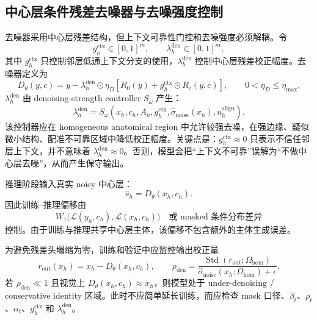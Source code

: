 \documentclass[11pt,a4paper,UTF8,fontset=fandol]{ctexart}
\theoremstyle{definition}
\DeclareMathOperator{\Std}{Std}
\begin{document}
\subsection{中心层条件残差去噪器与去噪强度控制}

去噪器采用中心层残差结构，但上下文可靠性门控和去噪强度必须解耦。令
\begin{equation}
    g_h^{\mathrm{ctx}}\in[0,1]^m,
    \qquad
    \lambda_h^{\mathrm{den}}\in[0,1]^m,
\end{equation}
其中 $g_h^{\mathrm{ctx}}$ 只控制邻层低通上下文分支的使用，$\lambda_h^{\mathrm{den}}$ 控制中心层残差校正幅度。去噪器定义为
\begin{equation}
\label{eq:denoiser-residual-coreA}
    D_\theta(y,c)=y-
    \lambda_h^{\mathrm{den}}\odot
    \eta_D\left[R_0(y)+g_h^{\mathrm{ctx}}\odot R_c(y,c)\right],
    \qquad
    0<\eta_D\le\eta_{\max}.
\end{equation}
$\lambda_h^{\mathrm{den}}$ 由 denoising-strength controller $S_\omega$ 产生：
\begin{equation}
\label{eq:strength-controller-auditC}
    \lambda_h^{\mathrm{den}}
    =S_\omega\left(x_h,c_h,A_h,g_h^{\mathrm{ctx}},\widehat\sigma_{\mathrm{noise}}(x_h),u_h^{\mathrm{align}}\right).
\end{equation}
该控制器应在 homogeneous anatomical region 中允许较强去噪，在强边缘、疑似微小结构、配准不可靠区域中降低校正幅度。关键点是：$g_h^{\mathrm{ctx}}\approx0$ 只表示不信任邻层上下文，并不意味着 $\lambda_h^{\mathrm{den}}\approx0$。否则，模型会把“上下文不可靠”误解为“不做中心层去噪”，从而产生保守输出。

推理阶段输入真实 noisy 中心层：
\begin{equation}
\label{eq:inference-coreA}
    \hat s_h=D_\theta(x_h,c_h).
\end{equation}
因此训练--推理偏移由
\begin{equation}
\label{eq:train-infer-shift-coreA}
    W_1\big(\mathcal L(y_h,c_h),\mathcal L(x_h,c_h)\big)
    \quad\text{或 masked 条件分布差异}
\end{equation}
控制。由于训练与推理共享中心层主体，该偏移不包含额外的主体生成误差。

为避免残差头塌缩为零，训练和验证中应监控输出校正量
\begin{equation}
\label{eq:output-residual-auditC}
    r_{\mathrm{out}}(x_h)=x_h-D_\theta(x_h,c_h),
    \qquad
    \rho_{\mathrm{den}}=\frac{\Std(r_{\mathrm{out}};\Omega_{\mathrm{hom}})}{\widehat\sigma_{\mathrm{noise}}(x_h;\Omega_{\mathrm{hom}})+\epsilon}.
\end{equation}
若 $\rho_{\mathrm{den}}\ll1$ 且视觉上 $D_\theta(x_h,c_h)\approx x_h$，则模型处于 under-denoising / conservative identity 区域。此时不应简单延长训练，而应检查 mask 口径、$\beta_t$、$\rho_t$、$\alpha_t$、$g_h^{\mathrm{ctx}}$ 和 $\lambda_h^{\mathrm{den}}$。
\end{document}

